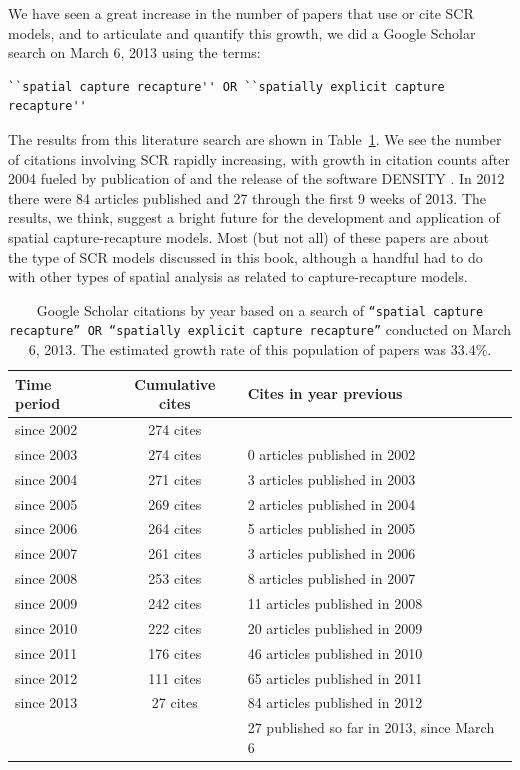We have seen a great increase in the number of papers that use or cite SCR models, and to
articulate and quantify this growth,
we did a Google Scholar search on
March 6, 2013 using the terms:
\begin{small}
\begin{verbatim}
``spatial capture recapture'' OR ``spatially explicit capture recapture''
\end{verbatim}
\end{small}
The results from this literature search are shown
 in Table~\ref{last.tab.cites}.
We see the number of citations involving SCR rapidly increasing,
with growth in citation counts after 2004 fueled by publication of
\citet{efford:2004} and the release of the software DENSITY
\citep{efford_etal:2004}. In 2012 there were 84 articles published and
27 through the first 9 weeks of 2013.
The results, we think, suggest a bright future
for the development and application of spatial capture-recapture
models. Most (but not all) of these papers are about the type of SCR models
discussed in this book, although a handful had to
do with other types of spatial analysis as related to
capture-recapture models.

\begin{table}[ht]
\caption{Google Scholar citations by year based on a search of
{\tt ``spatial capture recapture'' OR ``spatially explicit
capture recapture''} conducted on March 6, 2013. The estimated growth
rate of this population of papers was 33.4\%.
}
\begin{tabular}{lcl} \hline \hline
Time period & Cumulative cites & Cites in year previous \\ \hline
since 2002 & 274 cites & \\
since 2003 & 274 cites &0 articles published in 2002 \\
since 2004 & 271 cites &3 articles published in 2003 \\
since 2005 & 269 cites &2 articles published in 2004 \\
since 2006 & 264 cites &5 articles published in 2005 \\
since 2007 & 261 cites &3 articles published in 2006 \\
since 2008 & 253 cites &8 articles published in 2007 \\
since 2009 & 242 cites &11 articles published in 2008 \\
since 2010 & 222 cites &20 articles published in 2009 \\
since 2011 & 176 cites &46 articles published in 2010 \\
since 2012 & 111 cites &65 articles published in 2011 \\
since 2013 & 27 cites &84 articles published in 2012 \\
& &27 published so far in 2013, since March 6
\\ \hline
\end{tabular}
\label{last.tab.cites}
\end{table}

